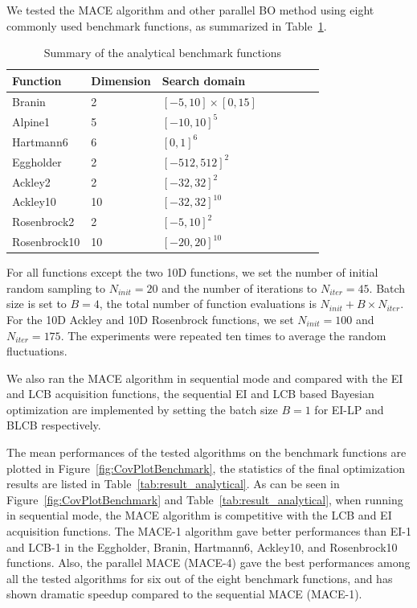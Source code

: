 We tested the MACE algorithm and other parallel BO method using eight commonly used benchmark
functions, as summarized in Table~\ref{tab:summaryanalygical}.

\begin{table}[htbp]
    \centering
    \caption{Summary of the analytical benchmark functions}
    \label{tab:summaryanalygical}
    \begin{tabular}{llllllll}
        \toprule
         Function           & Dimension        & Search domain             \\ \midrule
         Branin             & 2                & $[-5,  10]\times[0, 15]$  \\
         Alpine1            & 5                & $[-10, 10]^5$             \\
         Hartmann6          & 6                & $[0,   1]^6$              \\
         Eggholder          & 2                & $[-512, 512]^2$           \\
         Ackley2            & 2                & $[-32, 32]^2$             \\
         Ackley10           & 10               & $[-32, 32]^{10}$          \\
         Rosenbrock2        & 2                & $[-5,  10]^2$             \\
         Rosenbrock10       & 10               & $[-20, 20]^{10}$          \\
        \bottomrule
    \end{tabular}
    \vskip -0.2in
\end{table}

For all functions except the two 10D functions, we set the number of initial
random sampling to $N_{init} = 20$ and the number of iterations to $N_{iter} =
45$. Batch size is set to $B = 4$, the total number of function evaluations is
$N_{init} + B \times N_{iter}$. For the 10D Ackley and 10D Rosenbrock functions, we set
$N_{init} = 100$ and $N_{iter} = 175$. The experiments were repeated ten
times to average the random fluctuations.

We also ran the MACE algorithm in sequential mode and compared with the EI and LCB
acquisition functions, the sequential EI and LCB based Bayesian optimization
are implemented by setting the batch size $B = 1$ for EI-LP and BLCB
respectively.


The mean performances of the tested algorithms on the benchmark functions are
plotted in Figure~\ref{fig:CovPlotBenchmark}, the statistics of the final
optimization results are listed in Table~\ref{tab:result_analytical}. As can be
seen in Figure~\ref{fig:CovPlotBenchmark} and
Table~\ref{tab:result_analytical}, when running in sequential mode, the MACE
algorithm is competitive with the LCB and EI acquisition functions. The MACE-1
algorithm gave better performances than EI-1 and LCB-1 in the Eggholder,
Branin, Hartmann6, Ackley10, and Rosenbrock10 functions. Also, the parallel
MACE (MACE-4) gave the best performances among all the tested algorithms for
six out of the eight benchmark functions, and has shown dramatic speedup
compared to the sequential MACE (MACE-1).


